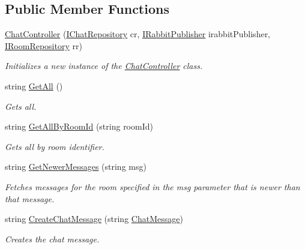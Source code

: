 \subsection*{Public Member Functions}
\begin{DoxyCompactItemize}
\item 
\hyperlink{class_wis_r_rest_a_p_i_1_1_controllers_1_1_chat_controller_a002ad6bcc7681a47304434501af09842}{Chat\+Controller} (\hyperlink{interface_wis_r_rest_a_p_i_1_1_providers_1_1_i_chat_repository}{I\+Chat\+Repository} cr, \hyperlink{interface_wis_r_rest_a_p_i_1_1_providers_1_1_i_rabbit_publisher}{I\+Rabbit\+Publisher} irabbit\+Publisher, \hyperlink{interface_wis_r_rest_a_p_i_1_1_domain_model_1_1_i_room_repository}{I\+Room\+Repository} rr)
\begin{DoxyCompactList}\small\item\em Initializes a new instance of the \hyperlink{class_wis_r_rest_a_p_i_1_1_controllers_1_1_chat_controller}{Chat\+Controller} class. \end{DoxyCompactList}\item 
string \hyperlink{class_wis_r_rest_a_p_i_1_1_controllers_1_1_chat_controller_a2ae23dbf792527feff86bc01509bdfd3}{Get\+All} ()
\begin{DoxyCompactList}\small\item\em Gets all. \end{DoxyCompactList}\item 
string \hyperlink{class_wis_r_rest_a_p_i_1_1_controllers_1_1_chat_controller_a5b86a0a1bfc4ea720dc6f516844fa63d}{Get\+All\+By\+Room\+Id} (string room\+Id)
\begin{DoxyCompactList}\small\item\em Gets all by room identifier. \end{DoxyCompactList}\item 
string \hyperlink{class_wis_r_rest_a_p_i_1_1_controllers_1_1_chat_controller_a160f5a59cda5dce2ff31255bdab85f13}{Get\+Newer\+Messages} (string msg)
\begin{DoxyCompactList}\small\item\em Fetches messages for the room specified in the msg parameter that is newer than that message. \end{DoxyCompactList}\item 
string \hyperlink{class_wis_r_rest_a_p_i_1_1_controllers_1_1_chat_controller_ae826964139207d0df7f85f43d0a73a21}{Create\+Chat\+Message} (string \hyperlink{class_wis_r_1_1_domain_model_1_1_chat_message}{Chat\+Message})
\begin{DoxyCompactList}\small\item\em Creates the chat message. \end{DoxyCompactList}\item 

\end{DoxyCompactItemize}
